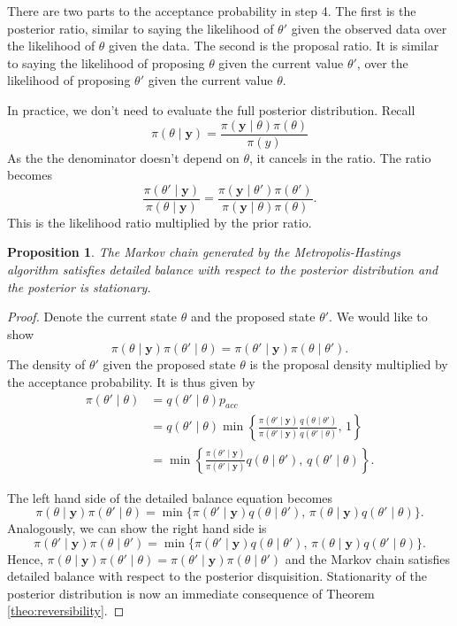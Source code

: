 \documentclass[
]{book}
\newtheorem{proposition}{Proposition}[chapter]
\theoremstyle{definition}
\theoremstyle{definition}
\theoremstyle{definition}
\theoremstyle{definition}
\theoremstyle{remark}
\begin{document}
There are two parts to the acceptance probability in step 4. The first is the posterior ratio, similar to saying the likelihood of \(\theta'\) given the observed data over the likelihood of \(\theta\) given the data. The second is the proposal ratio. It is similar to saying the likelihood of proposing \(\theta\) given the current value \(\theta'\), over the likelihood of proposing \(\theta'\) given the current value \(\theta\).

In practice, we don't need to evaluate the full posterior distribution. Recall
\[
\pi(\theta \mid \boldsymbol{y}) = \frac{\pi(\boldsymbol{y} \mid \theta) \pi(\theta)}{\pi(y)}
\]
As the the denominator doesn't depend on \(\theta\), it cancels in the ratio. The ratio becomes
\[
\frac{\pi(\theta' \mid \boldsymbol{y})}{\pi(\theta \mid \boldsymbol{y})} = \frac{\pi(\boldsymbol{y} \mid \theta') \pi(\theta')}{\pi(\boldsymbol{y} \mid \theta) \pi(\theta)}.
\]
This is the likelihood ratio multiplied by the prior ratio.

\begin{proposition}
The Markov chain generated by the Metropolis-Hastings algorithm satisfies detailed balance with respect to the posterior distribution and the posterior is stationary.
\end{proposition}

\begin{proof}
Denote the current state \(\theta\) and the proposed state \(\theta'\). We would like to show
\[
\pi(\theta \mid \boldsymbol{y}) \pi(\theta'\mid\theta) = \pi(\theta' \mid \boldsymbol{y}) \pi(\theta\mid\theta').
\]
The density of \(\theta'\) given the proposed state \(\theta\) is the proposal density multiplied by the acceptance probability. It is thus given by
\begin{align*}
\pi(\theta' \mid \theta) &= q(\theta' \mid \theta)p_{acc}\\
&=  q(\theta' \mid \theta)\min\left\{\frac{\pi(\theta' \mid \boldsymbol{y})}{\pi(\theta' \mid \boldsymbol{y})}\frac{q(\theta \mid \theta')}{q(\theta' \mid \theta)}, \, 1\right\} \\
& = \min\left\{\frac{\pi(\theta' \mid \boldsymbol{y})}{\pi(\theta' \mid \boldsymbol{y})}q(\theta \mid \theta'),\, q(\theta' \mid \theta)\right\}.
\end{align*}

The left hand side of the detailed balance equation becomes
\[
\pi(\theta \mid \boldsymbol{y})\pi(\theta' \mid \theta) = \min\{\pi(\theta' \mid \boldsymbol{y})q(\theta \mid \theta'),\, \pi(\theta \mid \boldsymbol{y})q(\theta' \mid \theta)\}.
\]
Analogously, we can show the right hand side is
\[
\pi(\theta' \mid \boldsymbol{y})\pi(\theta \mid \theta') = \min\{\pi(\theta' \mid \boldsymbol{y})q(\theta \mid \theta'),\, \pi(\theta \mid \boldsymbol{y})q(\theta' \mid \theta)\}.
\]
Hence, \(\pi(\theta \mid \boldsymbol{y}) \pi(\theta'\mid\theta) = \pi(\theta' \mid \boldsymbol{y}) \pi(\theta\mid\theta')\) and the Markov chain satisfies detailed balance with respect to the posterior disquisition. Stationarity of the posterior distribution is now an immediate consequence of Theorem \ref{theo:reversibility}.
\end{proof}
\end{document}

